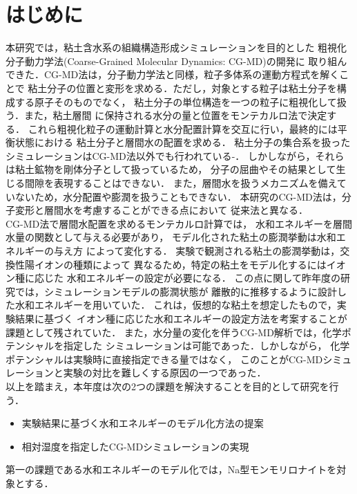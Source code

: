 \section{はじめに}
本研究では，粘土含水系の組織構造形成シミュレーションを目的とした
粗視化分子動力学法(Coarse-Grained Molecular Dynamics: CG-MD)の開発に
取り組んできた．CG-MD法は，分子動力学法と同様，粒子多体系の運動方程式を解くことで
粘土分子の位置と変形を求める．ただし，対象とする粒子は粘土分子を構成する原子そのものでなく，
粘土分子の単位構造を一つの粒子に粗視化して扱う．また，粘土層間
に保持される水分の量と位置をモンテカルロ法で決定する．
これら粗視化粒子の運動計算と水分配置計算を交互に行い，最終的には平衡状態における
粘土分子と層間水の配置を求める．
粘土分子の集合系を扱ったシミュレーションはCG-MD法以外でも行われている\cite{Eb2014}-\cite{Katti}．
しかしながら，それらは粘土鉱物を剛体分子として扱っているため，
分子の屈曲やその結果として生じる間隙を表現することはできない．
また，層間水を扱うメカニズムを備えていないため，水分配置や膨潤を扱うこともできない．
本研究のCG-MD法は，分子変形と層間水を考慮することができる点において
従来法と異なる．
\\
\hspace{\parindent}
CG-MD法で層間水配置を求めるモンテカルロ計算では，
水和エネルギーを層間水量の関数として与える必要があり，
モデル化された粘土の膨潤挙動は水和エネルギーの与え方
によって変化する．
実験で観測される粘土の膨潤挙動は，交換性陽イオンの種類によって
異なるため，特定の粘土をモデル化するにはイオン種に応じた
水和エネルギーの設定が必要になる．
この点に関して昨年度の研究では，シミュレーションモデルの膨潤状態が
離散的に推移するように設計した水和エネルギーを用いていた．
これは，仮想的な粘土を想定したもので，実験結果に基づく
イオン種に応じた水和エネルギーの設定方法を考案することが課題として残されていた．
また，水分量の変化を伴うCG-MD解析では，化学ポテンシャルを指定した
シミュレーションは可能であった．しかしながら，
化学ポテンシャルは実験時に直接指定できる量ではなく，
このことがCG-MDシミュレーションと実験の対比を難しくする原因の一つであった．\\
\hspace{\parindent}
以上を踏まえ，本年度は次の2つの課題を解決することを目的として研究を行う．
\begin{itemize}
\item
	実験結果に基づく水和エネルギーのモデル化方法の提案
\item
	相対湿度を指定したCG-MDシミュレーションの実現
\end{itemize}
第一の課題である水和エネルギーのモデル化では，Na型モンモリロナイトを対象とする．
